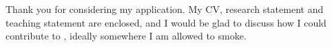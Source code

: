 
Thank you for considering my application. My CV, research statement and teaching statement are enclosed, and I would be glad to discuss how I could contribute to \theemployer, ideally somewhere I am allowed to smoke.
